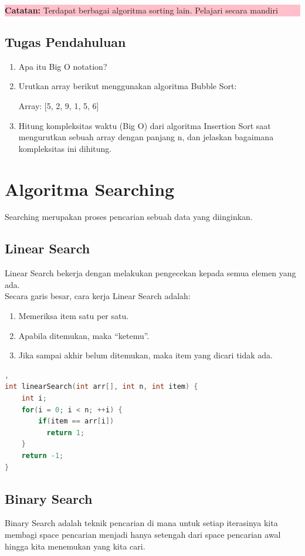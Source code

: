\begin{center}
    \colorbox{pink}{\parbox{0.8\linewidth}{\textbf{Catatan:} Terdapat berbagai algoritma sorting lain. Pelajari secara mandiri}}
\end{center}

\subsection{Tugas Pendahuluan}
\begin{enumerate}
    \item Apa itu Big O notation?
    \item Urutkan array berikut menggunakan algoritma Bubble Sort:

          Array: [5, 2, 9, 1, 5, 6]
    \item Hitung kompleksitas waktu (Big O) dari algoritma Insertion Sort saat mengurutkan sebuah array dengan panjang n, dan jelaskan bagaimana kompleksitas ini dihitung.
\end{enumerate}

\section{Algoritma Searching}
Searching merupakan proses pencarian sebuah data yang diinginkan.

\subsection{Linear Search}
Linear Search bekerja dengan melakukan pengecekan kepada semua elemen yang ada.\\
Secara garis besar, cara kerja Linear Search adalah:

\begin{enumerate}
    \item Memeriksa item satu per satu.
    \item Apabila ditemukan, maka “ketemu”.
    \item Jika sampai akhir belum ditemukan, maka item yang dicari tidak ada.
\end{enumerate}

\begin{lstlisting}[language=c,caption=Implementasi Linear Search], 
int linearSearch(int arr[], int n, int item) {
    int i;
    for(i = 0; i < n; ++i) {
        if(item == arr[i])
          return 1;
    }
    return -1;
}
\end{lstlisting}

\subsection{Binary Search}
Binary Search adalah teknik pencarian di mana untuk setiap iterasinya kita membagi space pencarian menjadi hanya setengah
dari space pencarian awal hingga kita menemukan yang kita cari.

